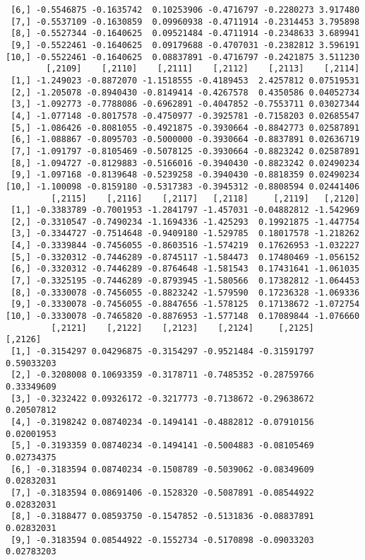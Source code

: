 \documentclass[
  letterpaper,
  DIV=11,
  numbers=noendperiod]{scrreprt}
\begin{document}
\begin{verbatim}
 [6,] -0.5546875 -0.1635742  0.10253906 -0.4716797 -0.2280273 3.917480
 [7,] -0.5537109 -0.1630859  0.09960938 -0.4711914 -0.2314453 3.795898
 [8,] -0.5527344 -0.1640625  0.09521484 -0.4711914 -0.2348633 3.689941
 [9,] -0.5522461 -0.1640625  0.09179688 -0.4707031 -0.2382812 3.596191
[10,] -0.5522461 -0.1640625  0.08837891 -0.4716797 -0.2421875 3.511230
        [,2109]    [,2110]    [,2111]    [,2112]    [,2113]    [,2114]
 [1,] -1.249023 -0.8872070 -1.1518555 -0.4189453  2.4257812 0.07519531
 [2,] -1.205078 -0.8940430 -0.8149414 -0.4267578  0.4350586 0.04052734
 [3,] -1.092773 -0.7788086 -0.6962891 -0.4047852 -0.7553711 0.03027344
 [4,] -1.077148 -0.8017578 -0.4750977 -0.3925781 -0.7158203 0.02685547
 [5,] -1.086426 -0.8081055 -0.4921875 -0.3930664 -0.8842773 0.02587891
 [6,] -1.088867 -0.8095703 -0.5000000 -0.3930664 -0.8837891 0.02636719
 [7,] -1.091797 -0.8105469 -0.5078125 -0.3930664 -0.8823242 0.02587891
 [8,] -1.094727 -0.8129883 -0.5166016 -0.3940430 -0.8823242 0.02490234
 [9,] -1.097168 -0.8139648 -0.5239258 -0.3940430 -0.8818359 0.02490234
[10,] -1.100098 -0.8159180 -0.5317383 -0.3945312 -0.8808594 0.02441406
         [,2115]    [,2116]    [,2117]   [,2118]     [,2119]   [,2120]
 [1,] -0.3383789 -0.7001953 -1.2841797 -1.457031 -0.04882812 -1.542969
 [2,] -0.3310547 -0.7490234 -1.1694336 -1.425293  0.19921875 -1.447754
 [3,] -0.3344727 -0.7514648 -0.9409180 -1.529785  0.18017578 -1.218262
 [4,] -0.3339844 -0.7456055 -0.8603516 -1.574219  0.17626953 -1.032227
 [5,] -0.3320312 -0.7446289 -0.8745117 -1.584473  0.17480469 -1.056152
 [6,] -0.3320312 -0.7446289 -0.8764648 -1.581543  0.17431641 -1.061035
 [7,] -0.3325195 -0.7446289 -0.8793945 -1.580566  0.17382812 -1.064453
 [8,] -0.3330078 -0.7456055 -0.8823242 -1.579590  0.17236328 -1.069336
 [9,] -0.3330078 -0.7456055 -0.8847656 -1.578125  0.17138672 -1.072754
[10,] -0.3330078 -0.7465820 -0.8876953 -1.577148  0.17089844 -1.076660
         [,2121]    [,2122]    [,2123]    [,2124]     [,2125]    [,2126]
 [1,] -0.3154297 0.04296875 -0.3154297 -0.9521484 -0.31591797 0.59033203
 [2,] -0.3208008 0.10693359 -0.3178711 -0.7485352 -0.28759766 0.33349609
 [3,] -0.3232422 0.09326172 -0.3217773 -0.7138672 -0.29638672 0.20507812
 [4,] -0.3198242 0.08740234 -0.1494141 -0.4882812 -0.07910156 0.02001953
 [5,] -0.3193359 0.08740234 -0.1494141 -0.5004883 -0.08105469 0.02734375
 [6,] -0.3183594 0.08740234 -0.1508789 -0.5039062 -0.08349609 0.02832031
 [7,] -0.3183594 0.08691406 -0.1528320 -0.5087891 -0.08544922 0.02832031
 [8,] -0.3188477 0.08593750 -0.1547852 -0.5131836 -0.08837891 0.02832031
 [9,] -0.3183594 0.08544922 -0.1552734 -0.5170898 -0.09033203 0.02783203

\end{verbatim}
\end{document}

